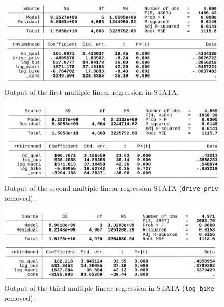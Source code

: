 \documentclass[
  letterpaper,
  DIV=11,
  numbers=noendperiod,
  oneside]{scrartcl}
\begin{document}
\begin{figure}

{\centering \includegraphics{Screenshot from 2023-04-20 06-49-02.png}

}

\caption{\label{fig-ols1}Output of the first multiple linear regression
in STATA.}

\end{figure}

\begin{figure}

{\centering \includegraphics{Screenshot from 2023-04-20 06-52-56.png}

}

\caption{\label{fig-ols2}Output of the second multiple linear regression
STATA (\texttt{drive\_priv} removed).}

\end{figure}

\begin{figure}

{\centering \includegraphics{Screenshot from 2023-04-20 06-53-21.png}

}

\caption{\label{fig-ols3}Output of the third multiple linear regression
in STATA (\texttt{log\_bike} removed).}

\end{figure}
\end{document}
